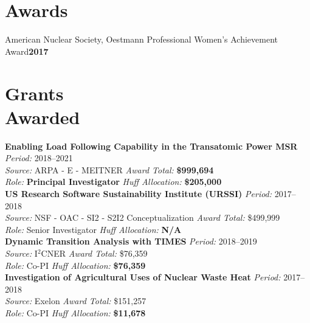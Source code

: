 \documentclass[margin,line]{resume}
\begin{document}
\begin{resume}

    \section{\mysidestyle Awards}
                American Nuclear Society, Oestmann Professional Women's Achievement Award\hfill \textbf{2017}%
    \section{\mysidestyle Grants\\Awarded} 
    \textbf{Enabling Load Following Capability in the Transatomic Power MSR} \hfill \textsl{Period:} 
    2018--2021\\
    \textsl{Source:} ARPA - E - MEITNER \hfill \textsl{Award Total:} \textbf{\$999,694}\\
    \textsl{Role:} \textbf{Principal Investigator} \hfill \textsl{Huff Allocation:} \textbf{\$205,000}\vspace{2mm}\\%
    \textbf{US Research Software Sustainability Institute (URSSI)} \hfill \textsl{Period:} 
    2017--2018\\
    \textsl{Source:} NSF - OAC - SI2 - S2I2 Conceptualization \hfill \textsl{Award Total:} \$499,999\\
    \textsl{Role:} Senior Investigator \hfill \textsl{Huff Allocation:} \textbf{N/A}\vspace{2mm}\\%
    \textbf{Dynamic Transition Analysis with TIMES} \hfill \textsl{Period:} 
    2018--2019\\
    \textsl{Source:} I$^2$CNER \hfill \textsl{Award Total:} \$76,359\\
    \textsl{Role:} Co-PI \hfill \textsl{Huff Allocation:} \textbf{\$76,359}\vspace{2mm}\\%
    \textbf{Investigation of Agricultural Uses of Nuclear Waste Heat} \hfill \textsl{Period:} 2017--2018\\
    \textsl{Source:} Exelon \hfill \textsl{Award Total:} \$151,257\\
    \textsl{Role:} Co-PI \hfill \textsl{Huff Allocation:} \textbf{\$11,678}\vspace{2mm}\\%

\end{resume}
\end{document}
